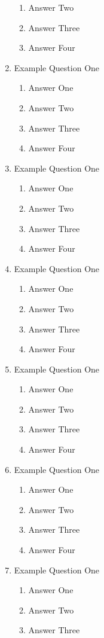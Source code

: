 \documentclass[11pt,fleqn]{article}
\begin{document}
\begin{enumerate}
\begin{enumerate}
	\item Answer Two
	\item Answer Three
	\item Answer Four
	\end{enumerate}
\item Example Question One
	\begin{enumerate}
	\item Answer One
	\item Answer Two
	\item Answer Three
	\item Answer Four
	\end{enumerate}
\item Example Question One
	\begin{enumerate}
	\item Answer One
	\item Answer Two
	\item Answer Three
	\item Answer Four
	\end{enumerate}
\item Example Question One
	\begin{enumerate}
	\item Answer One
	\item Answer Two
	\item Answer Three
	\item Answer Four
	\end{enumerate}
\item Example Question One
	\begin{enumerate}
	\item Answer One
	\item Answer Two
	\item Answer Three
	\item Answer Four
	\end{enumerate}
\item Example Question One
	\begin{enumerate}
	\item Answer One
	\item Answer Two
	\item Answer Three
	\item Answer Four
	\end{enumerate}
\item Example Question One
	\begin{enumerate}
	\item Answer One
	\item Answer Two
	\item Answer Three

\end{enumerate}
\end{enumerate}
\end{document}
